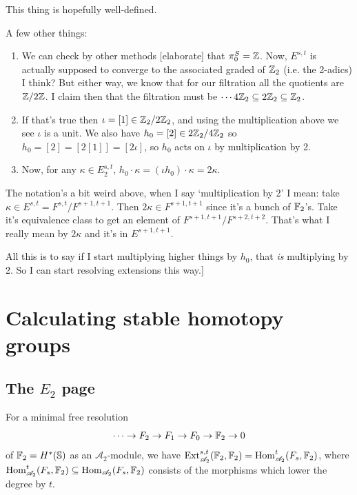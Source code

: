\documentclass{MetricNotes2023}
\def\bb{\ensuremath\mathbb}
\def\subq{\ensuremath\subseteq}
\def\inte{\ensuremath\mathbb{Z}}
\def\A{\ensuremath{\mathscr{A}_2}}
\DeclareMathOperator{\Ext}{Ext}
\DeclareMathOperator{\Hom}{Hom}
\begin{document}
This thing is hopefully well-defined.

A few other things:
\begin{enumerate}
\item We can check by other methods [elaborate] that \(\pi_0^S=\inte\). Now, \(E^{s,t}\) is actually supposed to converge to the associated graded of \(\inte_2\) (i.e. the 2-adics) I think? But either way, we know that for our filtration all the quotients are \(\inte/2\inte\). I claim then that the filtration must be \(\cdots 4\inte_2 \subq 2\inte_2 \subq \inte_2\). 
\item If that's true then \(\iota=[1]\in \inte_2/2\inte_2\), and using the multiplication above we see \(\iota\) is a unit. We also have \(h_0=[2]\in 2\inte_2/4\inte_2\) so \(h_0=[2]=[2[1]]=[2\iota]\), so \(h_0\) acts on \(\iota\) by multiplication by 2.
\item Now, for any \(\kappa\in E^{s,t}_2\), \(h_0\cdot \kappa = (\iota h_0)\cdot \kappa=2\kappa\). 
\end{enumerate}
The notation's a bit weird above, when I say `multiplication by 2' I mean: take \(\kappa \in E^{s,t}=F^{s,t}/F^{s+1,t+1}\). Then \(2\kappa \in F^{s+1,t+1}\) since it's a bunch of \(\bb{F}_2\)'s. Take it's equivalence class to get an element of \(F^{s+1, t+1}/F^{s+2,t+2}\). That's what I really mean by \(2\kappa\) and it's in \(E^{s+1,t+1}\).

All this is to say if I start multiplying higher things by \(h_0\), that \textit{is} multiplying by 2. So I can start resolving extensions this way.]

\autocite{ass}

\section{Calculating stable homotopy groups}

\subsection{The \(E_2\) page}


\begin{lemma}\label{2503171645shutupitsbeenalongterm}
For a minimal free resolution 
\[\cdots \to F_2 \to F_1 \to F_0 \to \bb{F}_2 \to 0\]
of \(\bb{F}_2=H^*(\bb{S})\) as an \(\A\)-module, we have \(\Ext_{\A}^{s,t}(\bb{F}_2, \bb{F}_2)=\Hom^t_{\A}(F_s, \bb{F}_2)\), where \(\Hom^t_{\A}(F_s, \bb{F}_2)\subq \Hom_{\A}(F_s, \bb{F}_2)\) consists of the morphisms which lower the degree by \(t\).
\end{lemma}
\end{document}
